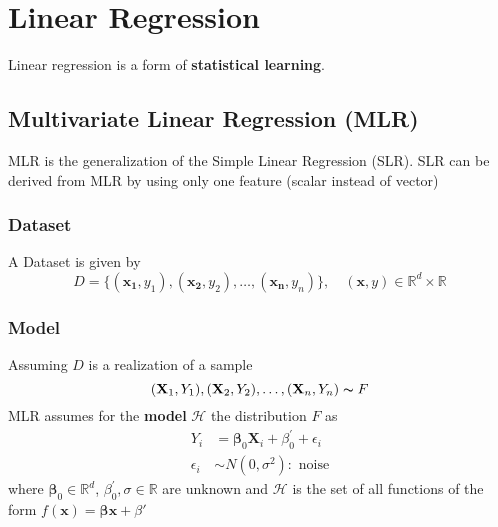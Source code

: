 \section{Linear Regression}
Linear regression is a form of \textbf{statistical learning}.

\subsection{Multivariate Linear Regression (MLR)}
MLR is the generalization of the Simple Linear Regression (SLR). SLR can be derived from MLR by using only one feature (scalar instead of vector)
\subsubsection{Dataset}

A Dataset is given by
\begin{equation*}
    D=\{(\mathbf{x_1},y_1),(\mathbf{x_2},y_2),\dots,(\mathbf{x_n},y_n)\}, \quad (\mathbf{x},y) \in\mathbb{R}^d\times\mathbb{R}
\end{equation*}

\subsubsection{Model}
Assuming $D$ is a realization of a sample
\begin{equation*}
    (\mathbf{X}_1,Y_1),(\mathbf{X}_2,Y_2),\dots,(\mathbf{X}_n,Y_n)\thicksim F
\end{equation*}
MLR assumes for the \textbf{model} $\mathcal{H}$ the distribution $F$ as
\begin{align*}
    Y_i        & =\boldsymbol{\beta}_0\mathbf{X}_i+\beta^{\prime}_0+\epsilon_i \\
    \epsilon_i & \sim N(0,\sigma^2): \text{ noise}
\end{align*}
where $\boldsymbol{\beta}_0\in \mathbb{R}^d$, $\beta^{\prime}_0,\sigma \in \mathbb{R}$ are unknown and $\mathcal{H}$ is the set of all functions of the form $f(\mathbf{x}) = \boldsymbol{\beta}\mathbf{x} +\beta'$

